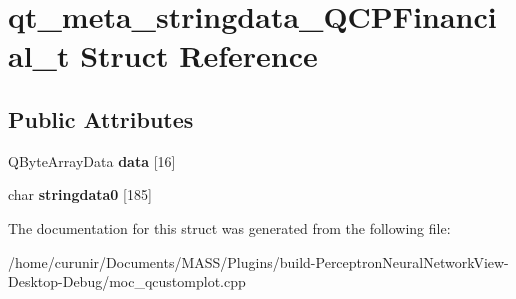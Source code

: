 \hypertarget{structqt__meta__stringdata___q_c_p_financial__t}{}\section{qt\+\_\+meta\+\_\+stringdata\+\_\+\+Q\+C\+P\+Financial\+\_\+t Struct Reference}
\label{structqt__meta__stringdata___q_c_p_financial__t}
\subsection*{Public Attributes}
\begin{DoxyCompactItemize}
\item 
Q\+Byte\+Array\+Data {\bfseries data} \mbox{[}16\mbox{]}\hypertarget{structqt__meta__stringdata___q_c_p_financial__t_a32be9c8341c33d8c6da741702c103986}{}\label{structqt__meta__stringdata___q_c_p_financial__t_a32be9c8341c33d8c6da741702c103986}

\item 
char {\bfseries stringdata0} \mbox{[}185\mbox{]}\hypertarget{structqt__meta__stringdata___q_c_p_financial__t_ad8ba9429514fbfd381c387ad7d4fd8c5}{}\label{structqt__meta__stringdata___q_c_p_financial__t_ad8ba9429514fbfd381c387ad7d4fd8c5}

\end{DoxyCompactItemize}


The documentation for this struct was generated from the following file\+:\begin{DoxyCompactItemize}
\item 
/home/curunir/\+Documents/\+M\+A\+S\+S/\+Plugins/build-\/\+Perceptron\+Neural\+Network\+View-\/\+Desktop-\/\+Debug/moc\+\_\+qcustomplot.\+cpp\end{DoxyCompactItemize}
